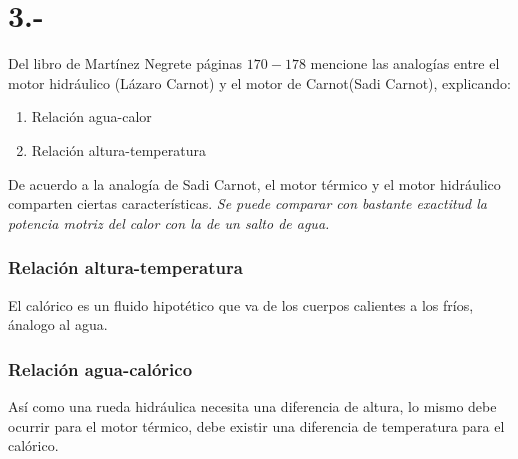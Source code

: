 \documentclass{article}
\begin{document}
\section*{3.-}
Del libro de Martínez Negrete páginas $170-178$ mencione las analogías entre el motor hidráulico
(Lázaro Carnot) y el motor de Carnot(Sadi Carnot), explicando:
\begin{enumerate}
    \item Relación agua-calor 
    \item Relación altura-temperatura
\end{enumerate}
\begin{tcolorbox}[breakable]
    De acuerdo a la analogía de Sadi Carnot, el motor térmico y el motor hidráulico comparten ciertas 
    características.
    \textit{Se puede comparar con bastante exactitud la potencia motriz del calor con la de un salto de agua.}
    \subsubsection*{Relación altura-temperatura}
    El calórico es un fluido hipotético que va de los cuerpos calientes a los fríos, ánalogo al agua.
    \subsubsection*{Relación agua-calórico}
    Así como una rueda hidráulica necesita una diferencia de altura, lo mismo debe ocurrir para el motor 
    térmico, debe existir una diferencia de temperatura para el calórico. 
\end{tcolorbox}
\end{document}
